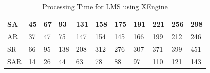 \begin{table}[t]
\begin{tabular}{|l|l|l|l|l|l|l|l|l|l|l|}
\scriptsize  {SA}
& \scriptsize  {45}
& \scriptsize {67}
& \scriptsize {93}
& \scriptsize {131}
& \scriptsize {158}
& \scriptsize {175}
& \scriptsize {191}
& \scriptsize {221}
& \scriptsize {256}
& \scriptsize {298}
\\ \hline



\scriptsize  {AR}
& \scriptsize  {37}
& \scriptsize {47}
& \scriptsize {75}
& \scriptsize {147}
& \scriptsize {154}
& \scriptsize {145}
& \scriptsize {166}
& \scriptsize {199}
& \scriptsize {212}
& \scriptsize {246}
\\ \hline

\scriptsize  {SR}
& \scriptsize  {66}
& \scriptsize {95}
& \scriptsize {138}
& \scriptsize {208}
& \scriptsize {312}
& \scriptsize {276}
& \scriptsize {307}
& \scriptsize {371}
& \scriptsize {399}
& \scriptsize {451}
\\ \hline

\scriptsize  {SAR}
& \scriptsize {14}
& \scriptsize {26}
& \scriptsize {44}
& \scriptsize {63}
& \scriptsize {78}
& \scriptsize {88}
& \scriptsize {97}
& \scriptsize {110}
& \scriptsize {121}
& \scriptsize {143}
\\ \hline
\end{tabular}
\caption{Processing Time for LMS using XEngine}\end{table}



